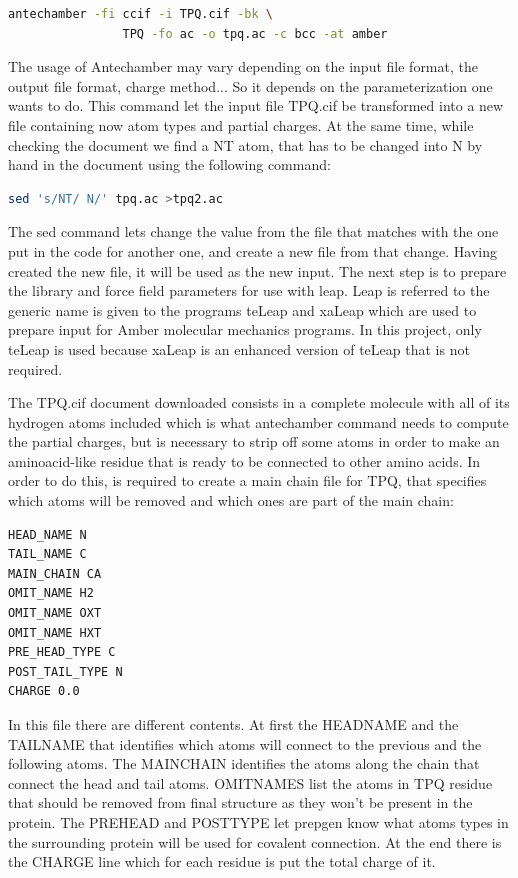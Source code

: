 \documentclass[a4paper]{article}
\begin{document}
   
\begin{lstlisting}[language=Bash,caption={Antechamber for TPQ}]
    antechamber -fi ccif -i TPQ.cif -bk \
                TPQ -fo ac -o tpq.ac -c bcc -at amber
\end{lstlisting}

The usage of Antechamber may vary depending on the input file format, the output file format, charge method... So it depends on the parameterization one wants to do.
This command let the input file TPQ.cif be transformed into a new file containing now atom types and partial charges. At the same time, while checking the document we find a NT atom, that has to be changed into N by hand in the document using the following command:

\begin{lstlisting}[language=Bash,caption={Changing values by sed}]
    sed 's/NT/ N/' tpq.ac >tpq2.ac
\end{lstlisting}

The sed command lets change the value from the file that matches with the one put in the code for another one, and create a new file from that change.
Having created the new file, it will be used as the new input. The next step is to prepare the library and force field parameters for use with leap. Leap is referred to the generic name is given to the programs teLeap and xaLeap which are used to prepare input for Amber molecular mechanics programs. In this project, only teLeap is used because xaLeap is an enhanced version of teLeap that is not required\cite{Amber23}.

The TPQ.cif document downloaded consists in a complete molecule with all of its hydrogen atoms included which is what antechamber command needs to compute the partial charges, but is necessary to strip off some atoms in order to make an aminoacid-like residue that is ready to be connected to other amino acids. In order to do this, is required to create a main chain file for TPQ, that specifies which atoms will be removed and which ones are part of the main chain:

\begin{verbatim}
HEAD_NAME N
TAIL_NAME C
MAIN_CHAIN CA
OMIT_NAME H2
OMIT_NAME OXT
OMIT_NAME HXT
PRE_HEAD_TYPE C
POST_TAIL_TYPE N
CHARGE 0.0
\end{verbatim}

In this file there are different contents. At first the HEADNAME and the TAILNAME that identifies which atoms will connect to the previous and the following atoms. The MAINCHAIN identifies the atoms along the chain that connect the head and tail atoms. OMITNAMES list the atoms in TPQ residue that should be removed from final structure as they won't be present in the protein. The PREHEAD and POSTTYPE let prepgen know what atoms types in the surrounding protein will be used for covalent connection. At the end there is the CHARGE line which for each residue is put the total charge of it.
\end{document}
